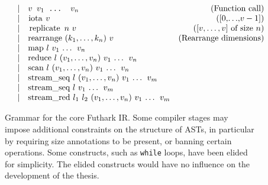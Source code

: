 \begin{figure*}[bt]
$$\begin{array}{lrlr}
      & | & \mbox{\texttt{$v$ $v_{1}$ \ldots{} $v_{n}$}} &  \mbox{(Function call)}\\
      & | & \mbox{\lstinline{iota} $v$} & \mbox{([0,$\ldots$,$v-1$])}\\
      & | & \mbox{\lstinline{replicate} $n$ $v$} &  \mbox{([$v,\ldots,v$] of size $n$)}\\
      & | & \mbox{\lstinline{rearrange} ($k_{1},\ldots,k_{n}$) $v$} &  \mbox{(Rearrange dimensions)}\\
      & | & \mbox{\lstinline{map} $l$ $v_{1}$ \ldots{} $v_{n}$} \\
      & | & \mbox{\lstinline{reduce} $l$ ($v_{1},\ldots,v_{n}$) $v_1$ \ldots{} $v_n$} \\
      & | & \mbox{\lstinline{scan} $l$ ($v_{1},\ldots,v_{n}$) $v_1$ \ldots{} $v_n$} \\
      & | & \mbox{\lstinline{stream_seq} $l$ ($v_{1},\ldots,v_{n}$) $v_1$ \ldots{} $v_m$} \\
      & | & \mbox{\lstinline{stream_seq} $l$ $v_1$ \ldots{} $v_m$} \\
      & | & \mbox{\lstinline!stream_red! $l_{1}$ $l_{2}$ ($v_{1},\ldots,v_{n}$) $v_1$ \ldots{} $v_m$}
  \end{array}
  $$
  \caption{Grammar for the core Futhark IR.  Some compiler stages may
    impose additional constraints on the structure of ASTs, in
    particular by requiring size annotations to be present, or banning
    certain operations.  Some constructs, such as \lstinline{while}
    loops, have been elided for simplicity.  The elided constructs
    would have no influence on the development of the thesis.}
  \label{fig:core-futhark-syntax}
\end{figure*}


